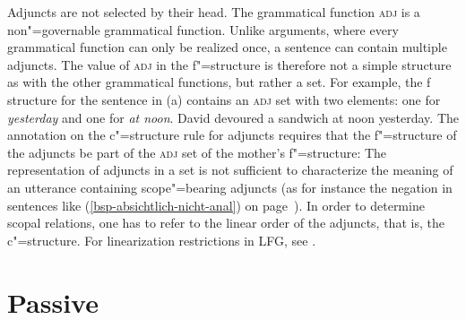 Adjuncts are not selected by their head. The grammatical function \textsc{adj} is a non"=governable grammatical function. Unlike arguments, where every grammatical
function can only be realized once, a sentence can contain multiple adjuncts. The value of \textsc{adj} in the f"=structure is therefore not a simple structure as with the other
grammatical functions, but rather a set. For example, the f structure for the sentence in (a)
contains an \textsc{adj} set with two elements: one for \emph{yesterday} and one for \emph{at noon}.
\eal
\ex\label{ex-david-devoured-a-sandwich-at-noon-yesterday} David devoured a sandwich at noon yesterday.
\ex\label{fstruc-david-devoured-a-sandwich-at-noon-yesterday} 
\zl
%
The annotation on the c"=structure rule for adjuncts requires that the f"=structure of the adjuncts
be part of the \textsc{adj} set of the mother's f"=structure:
\ea
{}
\z
The representation of adjuncts in a set is not sufficient to characterize the meaning of an
utterance containing scope"=bearing adjuncts (as for instance the negation in sentences like (\ref{bsp-absichtlich-nicht-anal})
on page~\pageref{bsp-absichtlich-nicht-anal}). In order to determine scopal relations, one has to
refer to the linear order of the adjuncts, that is, the c"=structure. For linearization
restrictions in LFG, see . 

\section{Passive}
\label{Abschnitt-LFG-Passiv}

